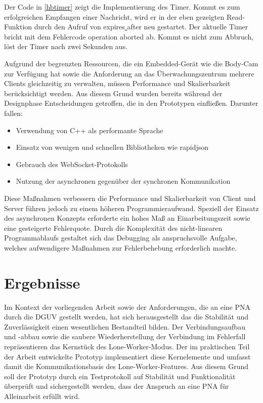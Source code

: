 \documentclass[thesis.tex]{subfiles}
\begin{document}
Der Code in \autoref{hbtimer} zeigt die Implementierung des Timer.
Kommt es zum erfolgreichen Empfangen einer Nachricht, wird er in der eben gezeigten Read-Funktion durch den Aufruf von \glqq expires\underline{ }after\grqq{} neu gestartet.
Der aktuelle Timer bricht mit dem Fehlercode \glqq operation aborted\grqq{} ab.
Kommt es nicht zum Abbruch, löst der Timer nach zwei Sekunden aus.

Aufgrund der begrenzten Ressourcen, die ein Embedded-Gerät wie die Body-Cam zur Verfügung hat sowie die Anforderung an das Überwachungszentrum mehrere Clients gleichzeitig zu verwalten, müssen Performance und Skalierbarkeit berücksichtigt werden.
Aus diesem Grund wurden bereits während der Designphase Entscheidungen getroffen, die in den Prototypen einfließen.
Darunter fallen:
\begin{itemize}
    \item Verwendung von C++ als performante Sprache
    \item Einsatz von wenigen und schnellen Bibliotheken wie \glqq rapidjson\grqq{}
    \item Gebrauch des WebSocket-Protokolls
    \item Nutzung der asynchronen gegenüber der synchronen Kommunikation
\end{itemize}

Diese Maßnahmen verbessern die Performance und Skalierbarkeit von Client und Server führen jedoch zu einem höheren Programmieraufwand.
Speziell der Einsatz des asynchronen Konzepts erforderte ein hohes Maß an Einarbeitungszeit sowie eine gesteigerte Fehlerquote.
Durch die Komplexität des nicht-linearen Programmablaufs gestaltet sich das Debugging als anspruchsvolle Aufgabe, welches aufwendigere Maßnahmen zur Fehlerbehebung erforderlich machte.

\section{Ergebnisse}

Im Kontext der vorliegenden Arbeit sowie der Anforderungen, die an eine PNA durch die DGUV gestellt werden, hat sich herausgestellt das die Stabilität und Zuverlässigkeit einen wesentlichen Bestandteil bilden.
Der Verbindungsaufbau und -abbau sowie die saubere Wiederherstellung der Verbindung im Fehlerfall repräsentieren das Kernstück des Lone-Worker-Modus.
Der im praktischen Teil der Arbeit entwickelte Prototyp implementiert diese Kernelemente und umfasst damit die Kommunikationsbasis des Lone-Worker-Features.
Aus diesem Grund soll der Prototyp durch ein Testprotokoll auf Stabilität und Funktionalität überprüft und sichergestellt werden, dass der Anspruch an eine PNA für Alleinarbeit erfüllt wird.
\end{document}
